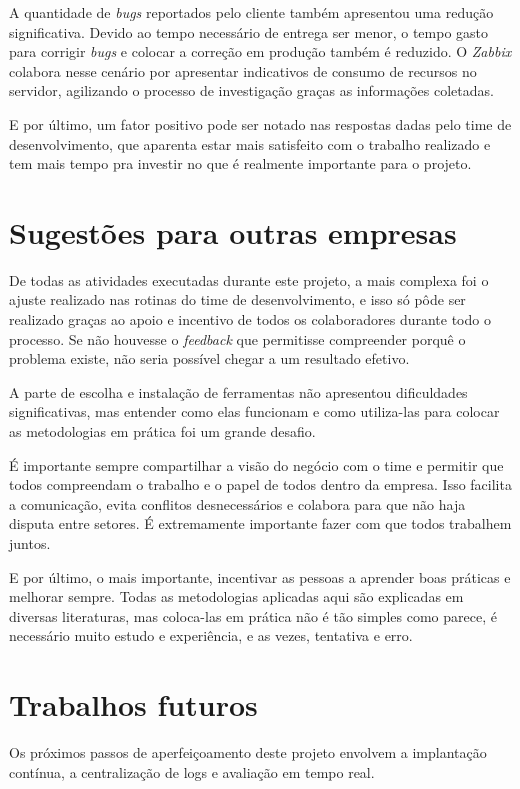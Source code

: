 \documentclass[
	12pt,				%
	openright,			%
	oneside,			%
	a4paper,			%
	english,			%
	french,				%
	spanish,			%
	brazil,				%
	]{abntex2}
\begin{document}
A quantidade de \textit{bugs} reportados pelo cliente também apresentou uma redução significativa. Devido ao tempo necessário de entrega ser menor, o tempo gasto para corrigir \textit{bugs} e colocar a correção em produção também é reduzido. O \textit{Zabbix} colabora nesse cenário por apresentar indicativos de consumo de recursos no servidor, agilizando o processo de investigação graças as informações coletadas.

E por último, um fator positivo pode ser notado nas respostas dadas pelo time de desenvolvimento, que aparenta estar mais satisfeito com o trabalho realizado e tem mais tempo pra investir no que é realmente importante para o projeto.

\chapter{Sugestões para outras empresas}

De todas as atividades executadas durante este projeto, a mais complexa foi o ajuste realizado nas rotinas do time de desenvolvimento, e isso só pôde ser realizado graças ao apoio e incentivo de todos os colaboradores durante todo o processo. Se não houvesse o \textit{feedback} que permitisse compreender porquê o problema existe, não seria possível chegar a um resultado efetivo.

A parte de escolha e instalação de ferramentas não apresentou dificuldades significativas, mas entender como elas funcionam e como utiliza-las para colocar as metodologias em prática foi um grande desafio.

É importante sempre compartilhar a visão do negócio com o time e permitir que todos compreendam o trabalho e o papel de todos dentro da empresa. Isso facilita a comunicação, evita conflitos desnecessários e colabora para que não haja disputa entre setores. É extremamente importante fazer com que todos trabalhem juntos.

E por último, o mais importante, incentivar as pessoas a aprender boas práticas e melhorar sempre. Todas as metodologias aplicadas aqui são explicadas em diversas literaturas, mas coloca-las em prática não é tão simples como parece, é necessário muito estudo e experiência, e as vezes, tentativa e erro.

\chapter{Trabalhos futuros}

Os próximos passos de aperfeiçoamento deste projeto envolvem a implantação contínua, a centralização de logs e avaliação em tempo real.
\end{document}
